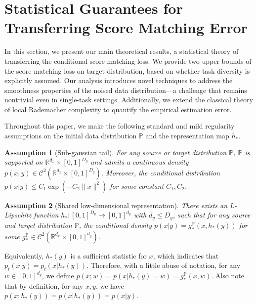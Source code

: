 \documentclass{article}
\numberwithin{equation}{section}
\newcommand{\R}{\mathbb{R}}
\newtheorem{asp}{Assumption}[section]
\theoremstyle{definition}
\renewcommand{\P}{\mathbb{P}}
\begin{document}
\section{Statistical Guarantees for Transferring Score Matching Error}\label{sec:generalization}

In this section, we present our main theoretical results, a statistical theory of transferring the conditional score matching loss.
We provide two upper bounds of the score matching loss on target distribution, based on whether task diversity  \citep{tripuraneni2020theory} is explicitly assumed.
Our analysis introduces novel techniques to address the smoothness properties of the noised data distribution—a challenge that remains nontrivial even in single-task settings. Additionally, we extend the classical theory of local Rademacher complexity to quantify the empirical estimation error.

Throughout this paper, we make the following standard and mild regularity assumptions \citep{tripuraneni2020theory,chen2023score} on the initial data distribution $\P$ and the representation map $h_*$.

\begin{asp}[Sub-gaussian tail]\label{asp:sub_gaussian}
    For any source or target distribution $\P$, $\P$ is supported on $\R^{d_x}\times[0,1]^{D_y}$ and admits a continuous density $p(x,y)\in \mathcal{C}^2(\R^{d_x}\times[0,1]^{D_y})$. 
    Moreover, the conditional distribution $p(x|y)\leq C_1\exp(-C_2\|x\|^2)$ for some constant $C_1,C_2$.
\end{asp}

\begin{asp}[Shared low-dimensional representation]\label{asp:low_dim}
    There exists an $L$-Lipschitz function $h_*:[0,1]^{D_y}\rightarrow[0,1]^{d_y}$ with $d_y\leq D_y$, such that for any source and target distribution $\P$, the conditional density $p(x|y)=g_*^{\P}(x,h_*(y))$ for some $g_*^{\P}\in\mathcal{C}^2(\R^{d_x}\times[0,1]^{d_y})$.
\end{asp}

Equivalently,  $h_*(y)$ is a sufficient statistic for $x$, which indicates that $p_t(x|y)=p_t(x|h_*(y))$.
Therefore, with a little abuse of notation, for any $w\in[0,1]^{d_y}$, we define $p(x;w)=p(x|h_*(y)=w)=g_*^{\P}(x,w)$. 
Also note that by definition, for any $x,y$, we have $p(x;h_*(y))=p(x|h_*(y))=p(x|y)$.
\end{document}
